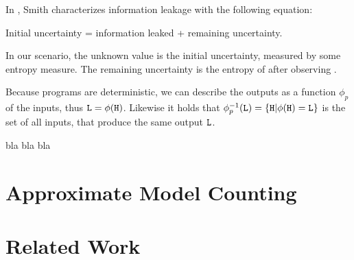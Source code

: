 In \cite{smith09}, Smith characterizes information leakage with the following equation:
\begin{center}
    Initial uncertainty = information leaked + remaining uncertainty.
\end{center}
In our scenario, the unknown value \In is the initial uncertainty, measured by some entropy measure. The remaining uncertainty is the entropy of \In after observing \Out. 

Because programs are deterministic, we can describe the outputs as a function $\phi_p$ of the inputs, thus $\mathtt{L} = \phi(\mathtt{H})$. Likewise it holds that $\phi_p^{-1}(\mathtt{L}) = \{ \mathtt{H} | \phi(\mathtt{H}) = \mathtt{L} \}$ is the set of all inputs, that produce the same output $\mathtt{L}$.

\begin{definition}
        bla bla bla
\end{definition}

\section{Approximate Model Counting}



\section{Related Work}
